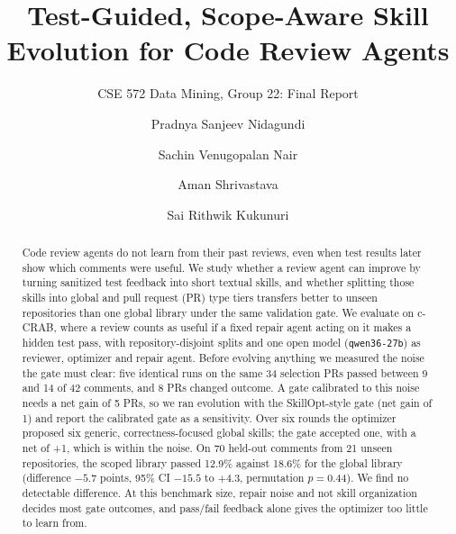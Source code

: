\documentclass[sigconf, authorversion, nonacm]{acmart}
\begin{document}
\title{Test-Guided, Scope-Aware Skill Evolution for Code Review Agents}
\subtitle{CSE 572 Data Mining, Group 22: Final Report}

\author{Pradnya Sanjeev Nidagundi}
\author{Sachin Venugopalan Nair}
\author{Aman Shrivastava}
\author{Sai Rithwik Kukunuri}

\renewcommand{\shortauthors}{Nidagundi, Nair, Shrivastava, and Kukunuri}

\begin{abstract}
Code review agents do not learn from their past reviews, even when test results later show which comments were useful. We study whether a review agent can improve by turning sanitized test feedback into short textual skills, and whether splitting those skills into global and pull request (PR) type tiers transfers better to unseen repositories than one global library under the same validation gate. We evaluate on c-CRAB, where a review counts as useful if a fixed repair agent acting on it makes a hidden test pass, with repository-disjoint splits and one open model (\texttt{qwen36-27b}) as reviewer, optimizer and repair agent. Before evolving anything we measured the noise the gate must clear: five identical runs on the same 34 selection PRs passed between 9 and 14 of 42 comments, and 8 PRs changed outcome. A gate calibrated to this noise needs a net gain of 5 PRs, so we ran evolution with the SkillOpt-style gate (net gain of 1) and report the calibrated gate as a sensitivity. Over six rounds the optimizer proposed six generic, correctness-focused global skills; the gate accepted one, with a net of +1, which is within the noise. On 70 held-out comments from 21 unseen repositories, the scoped library passed 12.9\% against 18.6\% for the global library (difference $-5.7$ points, 95\% CI $-15.5$ to $+4.3$, permutation $p = 0.44$). We find no detectable difference. At this benchmark size, repair noise and not skill organization decides most gate outcomes, and pass/fail feedback alone gives the optimizer too little to learn from.
\end{abstract}

\end{document}
